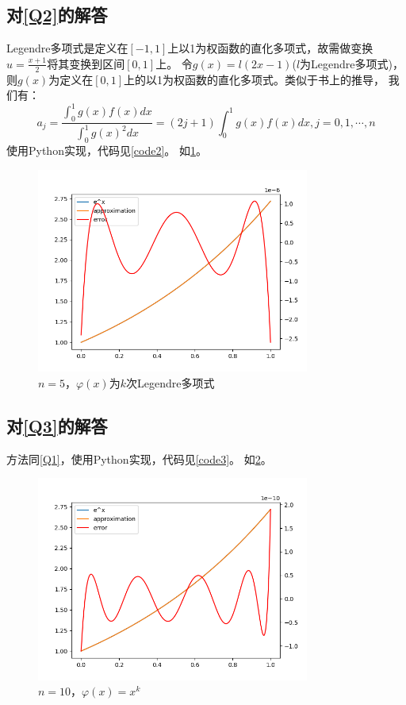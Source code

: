 \documentclass[a4paper,11pt,notitlepage]{article}
\begin{document}
\subsection{对\ref{Q2}的解答}
Legendre多项式是定义在$[-1,1]$上以1为权函数的直化多项式，故需做变换$u=\frac{x+1}{2}$将其变换到区间$[0,1]$上。
令$g(x)=l(2x-1)$($l$为Legendre多项式)，则$g(x)$为定义在$[0,1]$上的以1为权函数的直化多项式。类似于书上的推导，
我们有：
\begin{equation}
    a_j=\frac{\int_{0}^{1} g(x)f(x)dx}{\int_{0}^{1} g(x)^2dx}=(2j+1)\int_{0}^{1} g(x)f(x)dx,j=0,1,\cdots,n
\end{equation}
使用Python实现，代码见\cref{code2}。
如\cref{pic:2}。
\begin{figure}[H]
    \centering
    \includegraphics[width=0.8\textwidth]{../picture/Seventh_Week_1B.png}
    \caption{$n=5$，$\varphi(x)$为$k$次Legendre多项式}
    \label{pic:2}
\end{figure}

\subsection{对\ref{Q3}的解答}
方法同\ref{Q1}，使用Python实现，代码见\cref{code3}。
如\cref{pic:3}。
\begin{figure}[H]
    \centering
    \includegraphics[width=0.8\textwidth]{../picture/Seventh_Week_1C.png}
    \caption{$n=10$，$\varphi(x)=x^{k}$}
    \label{pic:3}
\end{figure}
\end{document}
